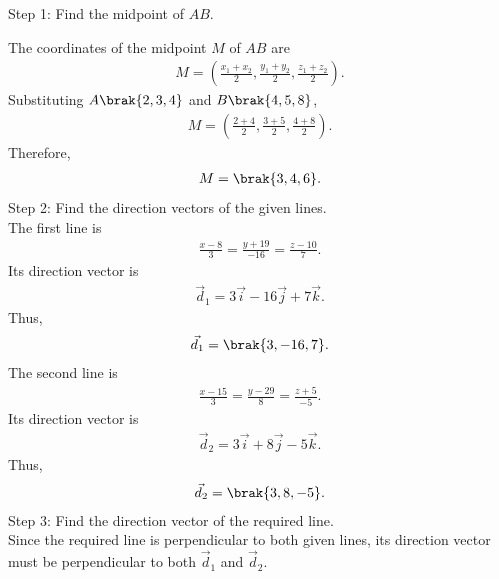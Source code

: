 \begin{enumerate}[label=\thesubsection.\arabic*, ref=\thesubsection.\theenumi]
{Step 1: Find the midpoint of $AB$.}

The coordinates of the midpoint $M$ of $AB$ are
\begin{align}
M=\left(
\frac{x_1+x_2}{2},
\frac{y_1+y_2}{2},
\frac{z_1+z_2}{2}
\right).
\end{align}
Substituting $A\brak{2,3,4}$ and $B\brak{4,5,8}$,
\begin{align}
M=\left(
\frac{2+4}{2},
\frac{3+5}{2},
\frac{4+8}{2}
\right).
\end{align}
Therefore,
\begin{align}
M=\brak{3,4,6}.
\end{align}
{Step 2: Find the direction vectors of the given lines.}
\\The first line is
\begin{align}
\frac{x-8}{3}=\frac{y+19}{-16}=\frac{z-10}{7}.
\end{align}
Its direction vector is
\begin{align}
\vec{d}_1=3\vec{i}-16\vec{j}+7\vec{k}.
\end{align}
Thus,
\begin{align}
\vec{d}_1=\brak{3,-16,7}.
\end{align}
The second line is
\begin{align}
\frac{x-15}{3}=\frac{y-29}{8}=\frac{z+5}{-5}.
\end{align}
Its direction vector is
\begin{align}
\vec{d}_2=3\vec{i}+8\vec{j}-5\vec{k}.
\end{align}
Thus,
\begin{align}
\vec{d}_2=\brak{3,8,-5}.
\end{align}
{Step 3: Find the direction vector of the required line.}
\\Since the required line is perpendicular to both given lines,
its direction vector must be perpendicular to both
$\vec{d}_1$ and $\vec{d}_2$.


\end{enumerate}
